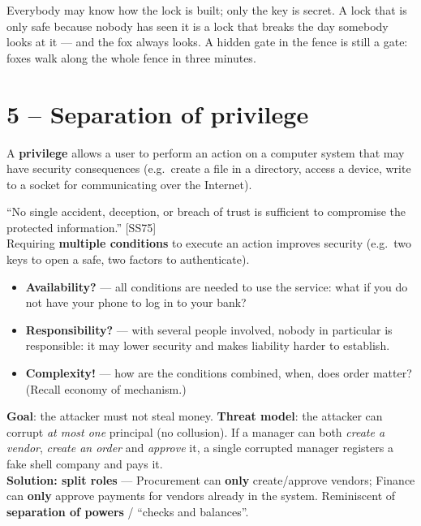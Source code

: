 \begin{goatbox}
Everybody may know how the lock is built; only the key is secret. A lock that is only safe
because nobody has seen it is a lock that breaks the day somebody looks at it --- and the fox
always looks. A hidden gate in the fence is still a gate: foxes walk along the whole fence in
three minutes.
\end{goatbox}

\section{5 -- Separation of privilege}

\begin{defnbox}[title=Privilege]
A \textbf{privilege} allows a user to perform an action on a computer system that may
have security consequences (e.g.\ create a file in a directory, access a device, write
to a socket for communicating over the Internet).
\end{defnbox}

\begin{defnbox}[title=Separation of privilege]
``No single accident, deception, or breach of trust is sufficient to compromise the
protected information.'' [SS75] \\
Requiring \textbf{multiple conditions} to execute an action improves security
(e.g.\ two keys to open a safe, two factors to authenticate).
\end{defnbox}

\begin{warnbox}[title=Problems]
\begin{itemize}
  \item \textbf{Availability?} --- all conditions are needed to use the service: what if you do
        not have your phone to log in to your bank?
  \item \textbf{Responsibility?} --- with several people involved, nobody in particular is
        responsible: it may lower security and makes liability harder to establish.
  \item \textbf{Complexity!} --- how are the conditions combined, when, does order matter?
        (Recall economy of mechanism.)
\end{itemize}
\end{warnbox}

\begin{exbox}[title=Payment system of a business]
\textbf{Goal}: the attacker must not steal money. \textbf{Threat model}: the attacker
can corrupt \emph{at most one} principal (no collusion). If a manager can both
\textit{create a vendor}, \textit{create an order} and \textit{approve} it, a single
corrupted manager registers a fake shell company and pays it. \\
\textbf{Solution: split roles} --- Procurement can \textbf{only} create/approve vendors;
Finance can \textbf{only} approve payments for vendors already in the system.
Reminiscent of \textbf{separation of powers} / ``checks and balances''.
\end{exbox}

